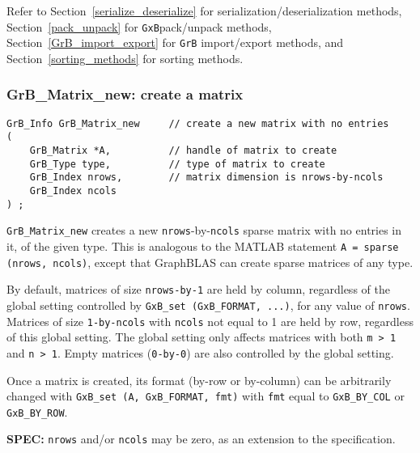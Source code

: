\documentclass[12pt]{article}
\begin{document}
\vspace{0.2in}
Refer to
Section~\ref{serialize_deserialize} for serialization/deserialization methods,
Section~\ref{pack_unpack} for \verb'GxB'pack/unpack methods,
Section~\ref{GrB_import_export} for \verb'GrB' import/export methods,
and
Section~\ref{sorting_methods} for sorting methods.

\subsubsection{{\sf GrB\_Matrix\_new:}          create a matrix}
\label{matrix_new}

\begin{mdframed}[userdefinedwidth=6in]
{\footnotesize
\begin{verbatim}
GrB_Info GrB_Matrix_new     // create a new matrix with no entries
(
    GrB_Matrix *A,          // handle of matrix to create
    GrB_Type type,          // type of matrix to create
    GrB_Index nrows,        // matrix dimension is nrows-by-ncols
    GrB_Index ncols
) ;
\end{verbatim} } \end{mdframed}

\verb'GrB_Matrix_new' creates a new \verb'nrows'-by-\verb'ncols' sparse matrix
with no entries in it, of the given type.  This is analogous to the MATLAB
statement \verb'A = sparse (nrows, ncols)', except that GraphBLAS can create
sparse matrices of any type.

By default, matrices of size \verb'nrows-by-1' are held by column, regardless
of the global setting controlled by \verb'GxB_set (GxB_FORMAT, ...)', for any
value of \verb'nrows'.  Matrices of size \verb'1-by-ncols' with \verb'ncols'
not equal to 1 are held by row, regardless of this global setting.  The global
setting only affects matrices with both \verb'm > 1' and \verb'n > 1'.  Empty
matrices (\verb'0-by-0') are also controlled by the global setting.

Once a matrix is created, its format (by-row or by-column) can be arbitrarily
changed with \verb'GxB_set (A, GxB_FORMAT, fmt)' with \verb'fmt' equal to
\verb'GxB_BY_COL' or \verb'GxB_BY_ROW'.

\begin{alert}
{\bf SPEC:} \verb'nrows' and/or \verb'ncols' may be zero,
as an extension to the specification.
\end{alert}
\end{document}
